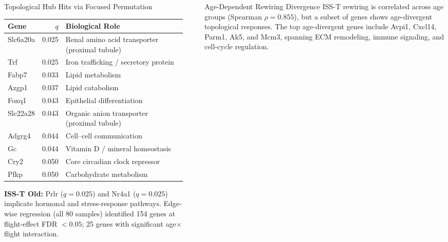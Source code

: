 \documentclass[final]{beamer}
\newlength{\sepwidth}
\newlength{\colwidth}
\newcommand{\separatorcolumn}{\begin{column}{\sepwidth}\end{column}}
\begin{document}
\begin{frame}[t]
\begin{columns}[t]
\begin{column}{\colwidth}
\begin{block}{Topological Hub Hits via Focused Permutation}
    \smallskip
    \begin{center}
    \small
    \begin{tabular}{lrl}
      \toprule
      \textbf{Gene} & \textbf{$q$} & \textbf{Biological Role} \\
      \midrule
      Slc6a20a  & 0.025 & Renal amino acid transporter (proximal tubule) \\
      Trf       & 0.025 & Iron trafficking / secretory protein \\
      Fabp7     & 0.033 & Lipid metabolism \\
      Azgp1     & 0.037 & Lipid catabolism \\
      Foxq1     & 0.043 & Epithelial differentiation \\
      Slc22a28  & 0.043 & Organic anion transporter (proximal tubule) \\
      Adgrg4    & 0.044 & Cell--cell communication \\
      Gc        & 0.044 & Vitamin D / mineral homeostasis \\
      Cry2      & 0.050 & Core circadian clock repressor \\
      Pfkp      & 0.050 & Carbohydrate metabolism \\
      \bottomrule
    \end{tabular}
    \end{center}

    \smallskip
    \textbf{ISS-T Old:} Prlr ($q = 0.025$) and Nr4a1 ($q = 0.025$) implicate
    hormonal and stress-response pathways. Edge-wise regression (all 80 samples)
    identified 154 genes at flight-effect FDR $< 0.05$; 25 genes with
    significant age$\times$flight interaction.
  \end{block}

\end{column}

\separatorcolumn

\begin{column}{\colwidth}

  \begin{block}{Age-Dependent Rewiring Divergence}
    \vspace{0.5ex}
    ISS-T rewiring is correlated across age groups (Spearman $\rho = 0.855$),
    but a subset of genes shows age-divergent topological responses. The top
    age-divergent genes include Avpi1, Cxcl14, Parm1, Ak5, and Mcm3, spanning
    ECM remodeling, immune signaling, and cell-cycle regulation.


\end{block}
\end{column}
\end{columns}
\end{frame}
\end{document}
